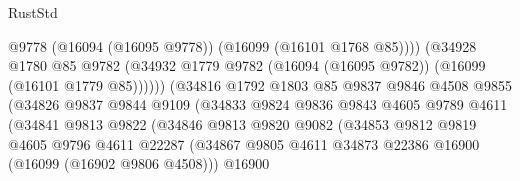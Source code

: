 \begin{lexlean}{RustStd}
\begin{coremodule}
                                          @9778
                                          (@16094 (@16095 @9778))
                                          (@16099 (@16101 @1768 @85))))
                                      (@34928
                                        @1780
                                        @85
                                        @9782
                                        (@34932
                                          @1779
                                          @9782
                                          (@16094 (@16095 @9782))
                                          (@16099 (@16101 @1779 @85))))))
                                  (@34816
                                    @1792
                                    @1803
                                    @85
                                    @9837
                                    @9846
                                    @4508
                                    @9855
                                    (@34826
                                      @9837
                                      @9844
                                      @9109
                                      (@34833
                                        @9824
                                        @9836
                                        @9843
                                        @4605
                                        @9789
                                        @4611
                                        (@34841
                                          @9813
                                          @9822
                                          (@34846
                                            @9813
                                            @9820
                                            @9082
                                            (@34853
                                              @9812
                                              @9819
                                              @4605
                                              @9796
                                              @4611
                                              @22287
                                              (@34867
                                                @9805
                                                @4611
                                                @34873
                                                @22386
                                                @16900
                                                (@16099 (@16902 @9806 @4508)))
                                              @16900

\end{coremodule}
\end{lexlean}
